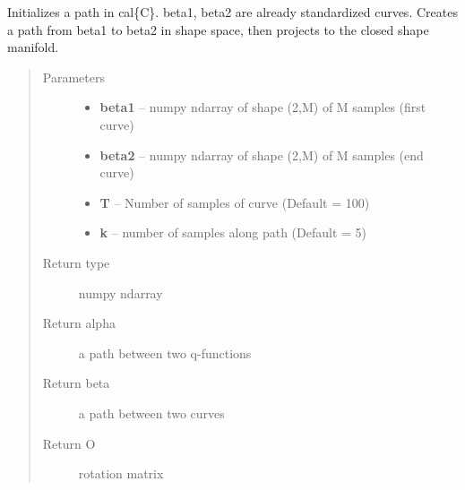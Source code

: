 \documentclass[letterpaper,10pt,english]{sphinxmanual}
\begin{document}

\begin{fulllineitems}
\label{geodesic:geodesic.init_path_geod}
Initializes a path in cal\{C\}. beta1, beta2 are already
standardized curves. Creates a path from beta1 to beta2 in
shape space, then projects to the closed shape manifold.
\begin{quote}\begin{description}
\item[{Parameters}] \leavevmode\begin{itemize}
\item {} 
\textbf{beta1} -- numpy ndarray of shape (2,M) of M samples (first curve)

\item {} 
\textbf{beta2} -- numpy ndarray of shape (2,M) of M samples (end curve)

\item {} 
\textbf{T} -- Number of samples of curve (Default = 100)

\item {} 
\textbf{k} -- number of samples along path (Default = 5)

\end{itemize}

\item[{Return type}] \leavevmode
numpy ndarray

\item[{Return alpha}] \leavevmode
a path between two q-functions

\item[{Return beta}] \leavevmode
a path between two curves

\item[{Return O}] \leavevmode
rotation matrix

\end{description}\end{quote}

\end{fulllineitems}

\end{document}
